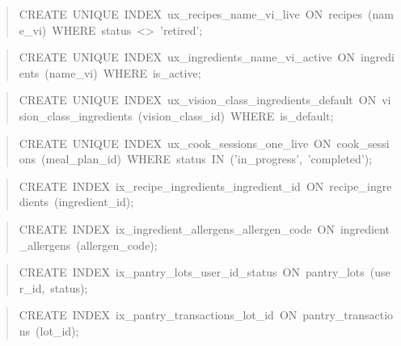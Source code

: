 \begin{quote}\scriptsize\ttfamily\raggedright
CREATE\ UNIQUE\ INDEX\ ux\_\allowbreak{}recipes\_\allowbreak{}name\_\allowbreak{}vi\_\allowbreak{}live\ ON\ recipes\ (name\_\allowbreak{}vi)\ WHERE\ status\ <>\ 'retired';
\end{quote}
\begin{quote}\scriptsize\ttfamily\raggedright
CREATE\ UNIQUE\ INDEX\ ux\_\allowbreak{}ingredients\_\allowbreak{}name\_\allowbreak{}vi\_\allowbreak{}active\ ON\ ingredients\ (name\_\allowbreak{}vi)\ WHERE\ is\_\allowbreak{}active;
\end{quote}
\begin{quote}\scriptsize\ttfamily\raggedright
CREATE\ UNIQUE\ INDEX\ ux\_\allowbreak{}vision\_\allowbreak{}class\_\allowbreak{}ingredients\_\allowbreak{}default\ ON\ vision\_\allowbreak{}class\_\allowbreak{}ingredients\ (vision\_\allowbreak{}class\_\allowbreak{}id)\ WHERE\ is\_\allowbreak{}default;
\end{quote}
\begin{quote}\scriptsize\ttfamily\raggedright
CREATE\ UNIQUE\ INDEX\ ux\_\allowbreak{}cook\_\allowbreak{}sessions\_\allowbreak{}one\_\allowbreak{}live\ ON\ cook\_\allowbreak{}sessions\ (meal\_\allowbreak{}plan\_\allowbreak{}id)\ WHERE\ status\ IN\ ('in\_\allowbreak{}progress',\ 'completed');
\end{quote}
\begin{quote}\scriptsize\ttfamily\raggedright
CREATE\ INDEX\ ix\_\allowbreak{}recipe\_\allowbreak{}ingredients\_\allowbreak{}ingredient\_\allowbreak{}id\ ON\ recipe\_\allowbreak{}ingredients\ (ingredient\_\allowbreak{}id);
\end{quote}
\begin{quote}\scriptsize\ttfamily\raggedright
CREATE\ INDEX\ ix\_\allowbreak{}ingredient\_\allowbreak{}allergens\_\allowbreak{}allergen\_\allowbreak{}code\ ON\ ingredient\_\allowbreak{}allergens\ (allergen\_\allowbreak{}code);
\end{quote}
\begin{quote}\scriptsize\ttfamily\raggedright
CREATE\ INDEX\ ix\_\allowbreak{}pantry\_\allowbreak{}lots\_\allowbreak{}user\_\allowbreak{}id\_\allowbreak{}status\ ON\ pantry\_\allowbreak{}lots\ (user\_\allowbreak{}id,\ status);
\end{quote}
\begin{quote}\scriptsize\ttfamily\raggedright
CREATE\ INDEX\ ix\_\allowbreak{}pantry\_\allowbreak{}transactions\_\allowbreak{}lot\_\allowbreak{}id\ ON\ pantry\_\allowbreak{}transactions\ (lot\_\allowbreak{}id);
\end{quote}
